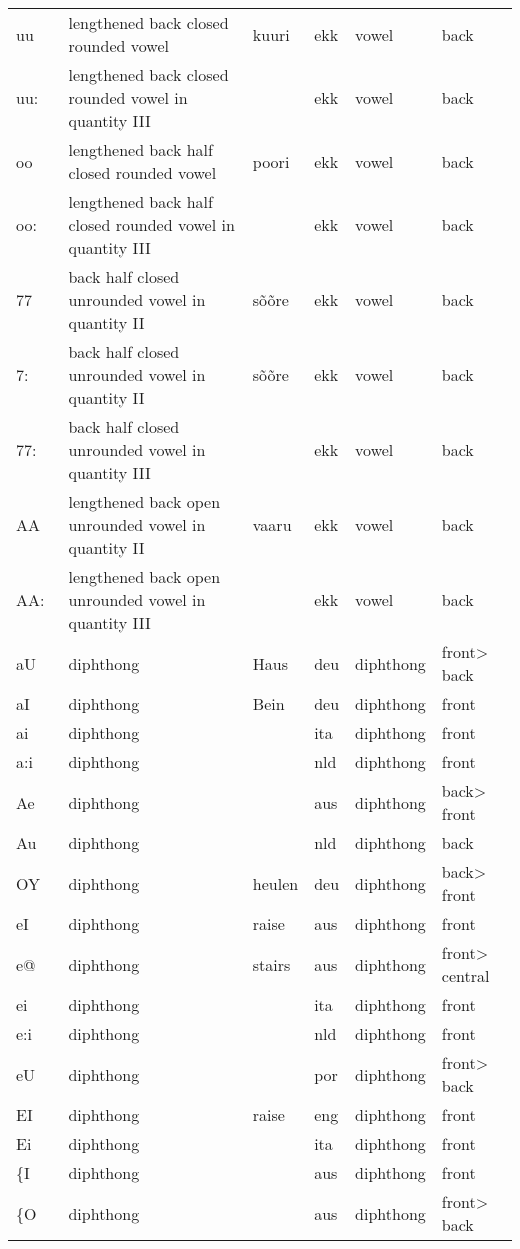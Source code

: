 {\begin{longtable}{l|p{.3\linewidth}|p{.15\linewidth}|l|p{.15\linewidth}|l}
	uu	& lengthened back closed rounded vowel	& kuuri	& ekk	& vowel	& back	\\
	uu:	& lengthened back closed rounded vowel in quantity III	& 	& ekk	& vowel	& back	\\
	oo	& lengthened back half closed rounded vowel	& poori	& ekk	& vowel	& back	\\
	oo:	& lengthened back half closed rounded vowel in quantity III	& 	& ekk	& vowel	& back	\\
	77	& back half closed unrounded vowel in quantity II	& sõõre	& ekk	& vowel	& back	\\
	7:	& back half closed unrounded vowel in quantity II	& sõõre	& ekk	& vowel	& back	\\
	77:	& back half closed unrounded vowel in quantity III	& 	& ekk	& vowel	& back	\\
	AA	& lengthened back open unrounded vowel in quantity II	& vaaru	& ekk	& vowel	& back	\\
	AA:\ & lengthened back open unrounded vowel in quantity III	& 	& ekk	& vowel	& back	\\
	aU	& diphthong	& Haus	& deu	& diphthong	& front\textgreater{} back	\\
	aI	& diphthong	& Bein	& deu	& diphthong	& front	\\
	ai	& diphthong	& 	& ita	& diphthong	& front	\\
	a:i	& diphthong	& 	& nld	& diphthong	& front	\\
	Ae	& diphthong	& 	& aus	& diphthong	& back\textgreater{} front	\\
	Au	& diphthong	& 	& nld	& diphthong	& back	\\
	OY	& diphthong	& heulen	& deu	& diphthong	& back\textgreater{} front	\\
	eI	& diphthong	& raise	& aus	& diphthong	& front	\\
	e@	& diphthong	& stairs	& aus	& diphthong	& front\textgreater{} central	\\
	ei	& diphthong	& 	& ita	& diphthong	& front	\\
	e:i	& diphthong	& 	& nld	& diphthong	& front	\\
	eU	& diphthong	& 	& por	& diphthong	& front\textgreater{} back	\\
	EI	& diphthong	& raise	& eng	& diphthong	& front	\\
	Ei	& diphthong	& 	& ita	& diphthong	& front	\\
	\{I	& diphthong	& 	& aus	& diphthong	& front	\\
	\{O	& diphthong	& 	& aus	& diphthong	& front\textgreater{} back	\\

\end{longtable}}
